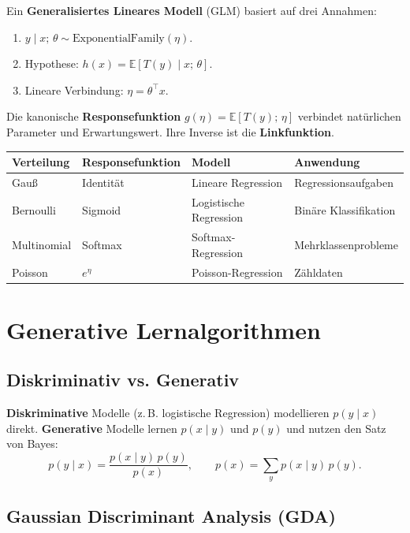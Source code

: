 \documentclass[11pt]{article}
\theoremstyle{csthm}
\theoremstyle{csdef}
\newcommand{\E}{\mathbb{E}}
\newcommand{\T}{^\top}
\begin{document}
Ein \textbf{Generalisiertes Lineares Modell} (GLM) basiert auf drei Annahmen:
\begin{enumerate}
  \item $y \mid x;\,\theta \sim \text{ExponentialFamily}(\eta)$.
  \item Hypothese: $h(x) = \E[T(y) \mid x;\,\theta]$.
  \item Lineare Verbindung: $\eta = \theta\T x$.
\end{enumerate}

Die kanonische \textbf{Responsefunktion} $g(\eta) = \E[T(y);\,\eta]$
verbindet natürlichen Parameter und Erwartungswert. Ihre Inverse ist die
\textbf{Linkfunktion}.

\begin{center}
\begin{tabular}{llll}
\toprule
Verteilung & Responsefunktion & Modell & Anwendung \\
\midrule
Gauß & Identität & Lineare Regression & Regressionsaufgaben \\
Bernoulli & Sigmoid & Logistische Regression & Binäre Klassifikation \\
Multinomial & Softmax & Softmax-Regression & Mehrklassenprobleme \\
Poisson & $e^\eta$ & Poisson-Regression & Zähldaten \\
\bottomrule
\end{tabular}
\end{center}

\section{Generative Lernalgorithmen}

\subsection{Diskriminativ vs. Generativ}

\textbf{Diskriminative} Modelle (z.\,B. logistische Regression) modellieren
$p(y \mid x)$ direkt. \textbf{Generative} Modelle lernen $p(x \mid y)$ und
$p(y)$ und nutzen den Satz von Bayes:
\begin{equation}
  p(y \mid x) = \frac{p(x \mid y)\,p(y)}{p(x)},
  \qquad p(x) = \sum_y p(x \mid y)\,p(y).
\end{equation}

\subsection{Gaussian Discriminant Analysis (GDA)}
\end{document}
